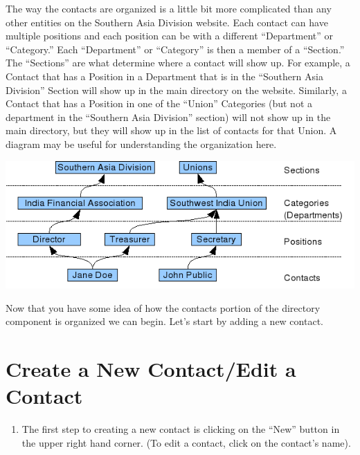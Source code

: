 \documentclass[letterpaper,10pt,english]{manual}
\begin{document}
The way the contacts are organized is a little bit more complicated than any other entities on the Southern Asia Division website.  Each contact can have multiple positions and each position can be with a different “Department” or “Category.”  Each “Department” or “Category” is then a member of a “Section.”  The “Sections” are what determine where a contact will show up.  For example, a Contact that has a Position in a Department that is in the “Southern Asia Division” Section will show up in the main directory on the website.  Similarly, a Contact that has a Position in one of the “Union” Categories (but not a department in the “Southern Asia Division” section) will not show up in the main directory, but they will show up in the list of contacts for that Union.  A diagram may be useful for understanding the organization here.

{\hfill\includegraphics{directoryContactsOrgDiagram1.png}\hfill}

Now that you have some idea of how the contacts portion of the directory component is organized we can begin.  Let's start by adding a new contact.

\hypertarget{index-56}{}\section{Create a New Contact/Edit a Contact}
\begin{enumerate}
\item {} 
The first step to creating a new contact is clicking on the “New” button in the upper right hand corner.  (To edit a contact, click on the contact's name).

\end{enumerate}
\end{document}
